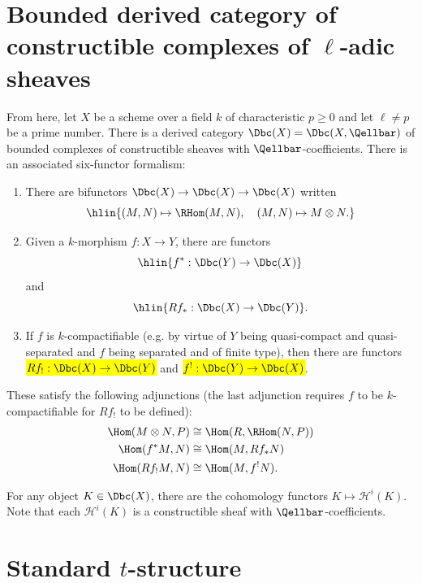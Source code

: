 



\section{Bounded derived category of constructible complexes of \texorpdfstring{$\ell$}{ell}-adic sheaves}

\TODO{}
From here, let $X$ be a scheme over a field $k$ of characteristic $p \geq 0$ and let $\ell \neq p$ be a prime number. There is a derived category $\Dbc(X) = \Dbc(X,\Qellbar)$ of bounded complexes of constructible sheaves with $\Qellbar$-coefficients. There is an associated six-functor formalism:
\begin{enumerate}
    \item There are bifunctors $\Dbc(X) \to \Dbc(X) \to \Dbc(X)$ written
    $$\hlin{(M,N) \mapsto \RHom(M,N), \quad (M,N) \mapsto M \otimes N.}$$
    \item Given a $k$-morphism $f: X \to Y$, there are functors 
    $$\hlin{f^*: \Dbc(Y) \to \Dbc(X)}$$
    and 
    $$\hlin{Rf_*: \Dbc(X) \to \Dbc(Y)}.$$
    \item If $f$ is $k$-compactifiable (e.g. by virtue of $Y$ being quasi-compact and quasi-separated and $f$ being separated and of finite type), then there are functors \hl{$Rf_!: \Dbc(X) \to \Dbc(Y)$} and \hl{$f^!: \Dbc(Y) \to \Dbc(X)$}.
\end{enumerate}

These satisfy the following adjunctions (the last adjunction requires $f$ to be $k$-compactifiable for $Rf_!$ to be defined):
\begin{align*}
    \Hom(M \otimes N, P) &\cong \Hom(R, \RHom(N,P)) \\
    \Hom(f^* M, N) &\cong \Hom(M, Rf_* N) \\
    \Hom(Rf_! M, N) &\cong \Hom(M, f^! N). \\
\end{align*}


For any object $K \in \Dbc(X)$, there are the cohomology functors $K \mapsto \mathscr{H}^i(K)$. Note that each $\mathscr{H}^i(K)$ is a constructible sheaf with $\Qellbar$-coefficients.



\section{Standard \texorpdfstring{$t$}{t}-structure}

